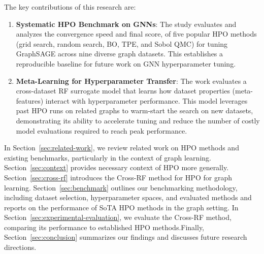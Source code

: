 The key contributions of this research are:
\begin{enumerate}
	\item \textbf{Systematic HPO Benchmark on GNNs}: The study evaluates and analyzes the convergence speed and final score, of five popular HPO methods (grid search, random search, BO, TPE, and Sobol QMC) for tuning GraphSAGE across nine diverse graph datasets. This establishes a reproducible baseline for future work on GNN hyperparameter tuning.
	\item \textbf{Meta-Learning for Hyperparameter Transfer}: The work evaluates a cross-dataset RF surrogate model that learns how dataset properties (meta-features) interact with hyperparameter performance. This model leverages past HPO runs on related graphs to warm-start the search on new datasets, demonstrating its ability to accelerate tuning and reduce the number of costly model evaluations required to reach peak performance.
\end{enumerate}

In Section~\ref{sec:related-work}, we review related work on HPO methods and existing benchmarks, particularly in the context of graph learning. Section~\ref{sec:context} provides necessary context of HPO more generally. Section~\ref{sec:cross-rf} introduces the Cross-RF method for HPO for graph learning. Section~\ref{sec:benchmark} outlines our benchmarking methodology, including dataset selection, hyperparameter spaces, and evaluated methods and reports on the performance of SoTA HPO methods in the graph setting. In Section~\ref{sec:experimental-evaluation}, we evaluate the Cross-RF method, comparing its performance to established HPO methods.Finally, Section~\ref{sec:conclusion} summarizes our findings and discusses future research directions.

